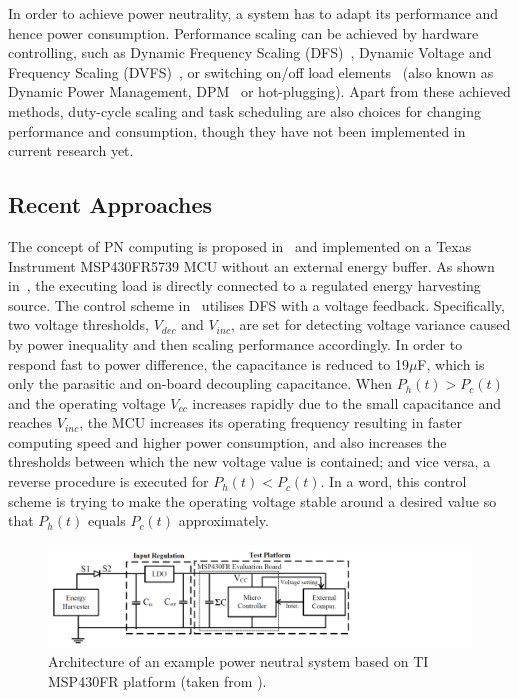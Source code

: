 In order to achieve power neutrality, a system has to adapt its performance and hence power consumption. Performance scaling can be achieved by hardware controlling, such as Dynamic Frequency Scaling (DFS)~\cite{balsamo2016graceful}, Dynamic Voltage and Frequency Scaling (DVFS)~\cite{fletcher2017power}, or switching on/off load elements~\cite{wang2016storage, fletcher2017power} (also known as Dynamic Power Management, DPM~\cite{lu2000low} or hot-plugging). Apart from these achieved methods, duty-cycle scaling and task scheduling are also choices for changing performance and consumption, though they have not been implemented in current research yet.

\subsection{Recent Approaches}

The concept of PN computing is proposed in~\cite{balsamo2016graceful} and implemented on a Texas Instrument MSP430FR5739 MCU without an external energy buffer. As shown in~, the executing load is directly connected to a regulated energy harvesting source. The control scheme in~\cite{balsamo2016graceful} utilises DFS with a voltage feedback. Specifically, two voltage thresholds, $V_{dec}$ and $V_{inc}$, are set for detecting voltage variance caused by power inequality and then scaling performance accordingly. In order to respond fast to power difference, the capacitance is reduced to 19$\mu$F, which is only the parasitic and on-board decoupling capacitance. When $P_h(t) > P_c(t)$ and the operating voltage $V_{cc}$ increases rapidly due to the small capacitance and reaches $V_{inc}$, the MCU increases its operating frequency resulting in faster computing speed and higher power consumption, and also increases the thresholds between which the new voltage value is contained; and vice versa, a reverse procedure is executed for $P_h(t) < P_c(t)$. In a word, this control scheme is trying to make the operating voltage stable around a desired value so that $P_h(t)$  equals $P_c(t)$ approximately.

\begin{figure}
    \centering
    \includegraphics[width=\columnwidth]{ch2_review/figures/graceful_schematic}
    \caption{Architecture of an example power neutral system based on TI MSP430FR platform (taken from \cite{balsamo2016graceful}).}
    \label{Figure:graceful_schematic}
\end{figure}

